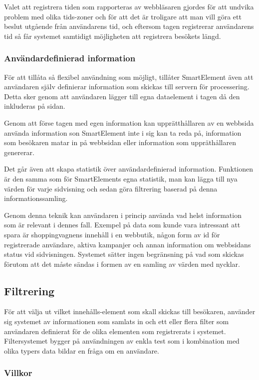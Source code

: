 Valet att registrera tiden som rapporteras av webbläsaren gjordes för att undvika problem med olika tids-zoner och för att det är troligare att man vill göra ett beslut utgående från användarens tid, och eftersom tagen registrerar användarens tid så får systemet samtidigt möjligheten att registrera besökets längd.

\subsubsection{Användardefinierad information}

För att tillåta så flexibel användning som möjligt, tillåter SmartElement även att användaren själv definierar information som skickas till servern för processering. Detta sker genom att användaren lägger till egna dataelement i tagen då den inkluderas på sidan.

Genom att förse tagen med egen information kan upprätthållaren av en webbsida använda information son SmartElement inte i sig kan ta reda på, information som besökaren matar in på webbsidan eller information som uppräthållaren genererar.

Det går även att skapa statistik över användardefinierad information. Funktionen är den samma som för SmartElements egna statistik, man kan lägga till nya värden för varje sidvisning och sedan göra filtrering baserad på denna informationssamling.

Genom denna teknik kan användaren i princip använda vad helst information som är relevant i dennes fall. Exempel på data som kunde vara intressant att spara är shoppingvagnens innehåll i en webbutik, någon form av id för registrerade användare, aktiva kampanjer och annan information om webbsidans status vid sidvisningen. Systemet sätter ingen begränsning på vad som skickas förutom att det måste sändas i formen av en samling av värden med nycklar.

\subsection{Filtrering}


För att välja ut vilket innehålls-element som skall skickas till besökaren, använder sig systemet av informationen som samlats in och ett eller flera filter som användaren definierat för de olika elementen som registrerats i systemet. Filtersystemet bygger på användningen av enkla test som i kombination med olika typers data bildar en fråga om en användare.

\subsubsection{Villkor}

